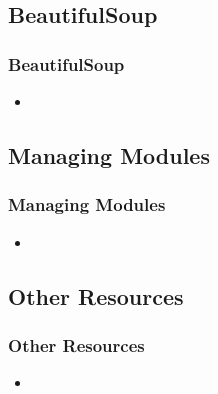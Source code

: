 \subsection{BeautifulSoup}
\begin{frame}
    \frametitle{BeautifulSoup}
    \vspace{5mm}
    
    \begin{itemize}
      \item 
    \end{itemize}
\end{frame}

\subsection{Managing Modules}
\begin{frame}
    \frametitle{Managing Modules}
    \vspace{5mm}
    
    \begin{itemize}
      \item 
    \end{itemize}
\end{frame}

\subsection{Other Resources}
\begin{frame}
    \frametitle{Other Resources}
    \vspace{5mm}
    
    \begin{itemize}
      \item 
    \end{itemize}
\end{frame}


